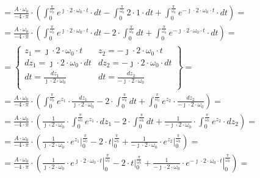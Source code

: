 \begin{task}
\begin{align*}
&=\frac{A \cdot \omega_0}{-4 \cdot \pi} \cdot \left( \int_{0}^{\frac{\pi}{\omega_0}} e^{\jmath \cdot 2 \cdot \omega_0 \cdot t} \cdot dt - \int_{0}^{\frac{\pi}{\omega_0}}2 \cdot 1 \cdot dt +  \int_{0}^{\frac{\pi}{\omega_0}} e^{-\jmath \cdot 2 \cdot \omega_0 \cdot t} \cdot dt\right)=\\
&=\frac{A \cdot \omega_0}{-4 \cdot \pi} \cdot \left( \int_{0}^{\frac{\pi}{\omega_0}} e^{\jmath \cdot 2 \cdot \omega_0 \cdot t} \cdot dt -2 \cdot \int_{0}^{\frac{\pi}{\omega_0}} dt +  \int_{0}^{\frac{\pi}{\omega_0}} e^{-\jmath \cdot 2 \cdot \omega_0 \cdot t} \cdot dt\right)=\\
&=\begin{Bmatrix}
z_1 = \jmath \cdot 2 \cdot \omega_0 \cdot t & z_2 = -\jmath \cdot 2 \cdot \omega_0 \cdot t\\
dz_1 = \jmath \cdot 2 \cdot \omega_0 \cdot dt & dz_2 = -\jmath \cdot 2 \cdot \omega_0 \cdot dt\\
dt = \frac{dz_1}{\jmath \cdot 2 \cdot \omega_0} & dt = \frac{dz_2}{-\jmath \cdot 2 \cdot \omega_0}\\
\end{Bmatrix}=\\
&=\frac{A \cdot \omega_0}{-4 \cdot \pi} \cdot \left( \int_{0}^{\frac{\pi}{\omega_0}} e^{z_1} \cdot \frac{dz_1}{\jmath \cdot 2 \cdot \omega_0} -2 \cdot \int_{0}^{\frac{\pi}{\omega_0}} dt +  \int_{0}^{\frac{\pi}{\omega_0}} e^{z_2} \cdot  \frac{dz_2}{-\jmath \cdot 2 \cdot \omega_0}\right)=\\
&=\frac{A \cdot \omega_0}{-4 \cdot \pi} \cdot \left( \frac{1}{\jmath \cdot 2 \cdot \omega_0} \cdot \int_{0}^{\frac{\pi}{\omega_0}} e^{z_1} \cdot dz_1 -2 \cdot \int_{0}^{\frac{\pi}{\omega_0}} dt +  \frac{1}{-\jmath \cdot 2 \cdot \omega_0}\cdot \int_{0}^{\frac{\pi}{\omega_0}} e^{z_2} \cdot  dz_2\right)=\\
&=\frac{A \cdot \omega_0}{-4 \cdot \pi} \cdot \left( \frac{1}{\jmath \cdot 2 \cdot \omega_0} \cdot \left. e^{z_1} \right|_{0}^{\frac{\pi}{\omega_0}} - 2 \cdot \left. t\right|_{0}^{\frac{\pi}{\omega_0}} +  \frac{1}{-\jmath \cdot 2 \cdot \omega_0}\cdot \left. e^{z_2} \right|_{0}^{\frac{\pi}{\omega_0}}\right)=\\
&=\frac{A \cdot \omega_0}{-4 \cdot \pi} \cdot \left( \frac{1}{\jmath \cdot 2 \cdot \omega_0} \cdot \left. e^{\jmath \cdot 2 \cdot \omega_0 \cdot t} \right|_{0}^{\frac{\pi}{\omega_0}} - 2 \cdot \left. t\right|_{0}^{\frac{\pi}{\omega_0}} +  \frac{1}{-\jmath \cdot 2 \cdot \omega_0}\cdot \left. e^{-\jmath \cdot 2 \cdot \omega_0 \cdot t} \right|_{0}^{\frac{\pi}{\omega_0}}\right)=\\

\end{align*}
\end{task}
